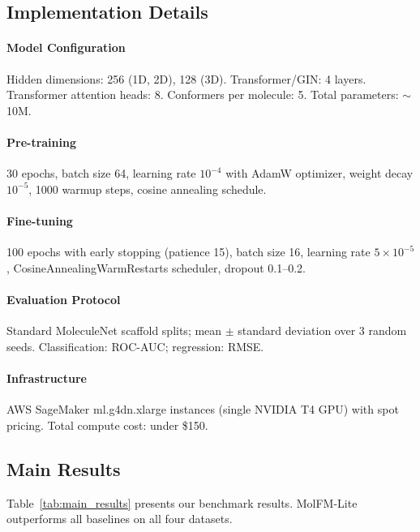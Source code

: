 \documentclass[11pt]{article}
\newcommand{\modelname}{MolFM-Lite}
\begin{document}
\subsection{Implementation Details}

\paragraph{Model Configuration}
Hidden dimensions: 256 (1D, 2D), 128 (3D). Transformer/GIN: 4 layers. Transformer attention heads: 8. Conformers per molecule: 5. Total parameters: $\sim$10M.

\paragraph{Pre-training}
30 epochs, batch size 64, learning rate $10^{-4}$ with AdamW optimizer, weight decay $10^{-5}$, 1000 warmup steps, cosine annealing schedule.

\paragraph{Fine-tuning}
100 epochs with early stopping (patience 15), batch size 16, learning rate $5 \times 10^{-5}$, CosineAnnealingWarmRestarts scheduler, dropout 0.1--0.2.

\paragraph{Evaluation Protocol}
Standard MoleculeNet scaffold splits; mean $\pm$ standard deviation over 3 random seeds. Classification: ROC-AUC; regression: RMSE.

\paragraph{Infrastructure}
AWS SageMaker ml.g4dn.xlarge instances (single NVIDIA T4 GPU) with spot pricing. Total compute cost: under \$150.

\subsection{Main Results}

Table~\ref{tab:main_results} presents our benchmark results. \modelname{} outperforms all baselines on all four datasets.
\end{document}
